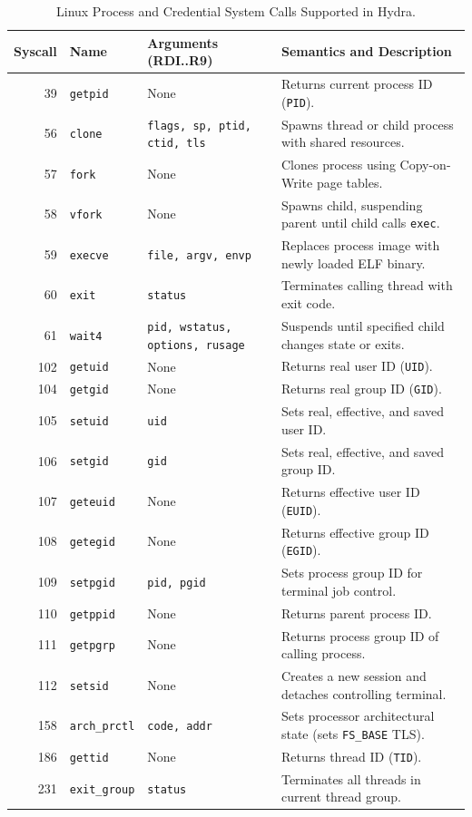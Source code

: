 \begin{table}[htbp]
\centering
\small
\begin{tabularx}{\textwidth}{rllX}
\toprule
\textbf{Syscall} & \textbf{Name} & \textbf{Arguments (RDI..R9)} & \textbf{Semantics and Description} \\
\midrule
39 & \texttt{getpid} & None & Returns current process ID (\texttt{PID}). \\
56 & \texttt{clone} & \texttt{flags, sp, ptid, ctid, tls} & Spawns thread or child process with shared resources. \\
57 & \texttt{fork} & None & Clones process using Copy-on-Write page tables. \\
58 & \texttt{vfork} & None & Spawns child, suspending parent until child calls \texttt{exec}. \\
59 & \texttt{execve} & \texttt{file, argv, envp} & Replaces process image with newly loaded ELF binary. \\
60 & \texttt{exit} & \texttt{status} & Terminates calling thread with exit code. \\
61 & \texttt{wait4} & \texttt{pid, wstatus, options, rusage} & Suspends until specified child changes state or exits. \\
102 & \texttt{getuid} & None & Returns real user ID (\texttt{UID}). \\
104 & \texttt{getgid} & None & Returns real group ID (\texttt{GID}). \\
105 & \texttt{setuid} & \texttt{uid} & Sets real, effective, and saved user ID. \\
106 & \texttt{setgid} & \texttt{gid} & Sets real, effective, and saved group ID. \\
107 & \texttt{geteuid} & None & Returns effective user ID (\texttt{EUID}). \\
108 & \texttt{getegid} & None & Returns effective group ID (\texttt{EGID}). \\
109 & \texttt{setpgid} & \texttt{pid, pgid} & Sets process group ID for terminal job control. \\
110 & \texttt{getppid} & None & Returns parent process ID. \\
111 & \texttt{getpgrp} & None & Returns process group ID of calling process. \\
112 & \texttt{setsid} & None & Creates a new session and detaches controlling terminal. \\
158 & \texttt{arch\_prctl} & \texttt{code, addr} & Sets processor architectural state (sets \texttt{FS\_BASE} TLS). \\
186 & \texttt{gettid} & None & Returns thread ID (\texttt{TID}). \\
231 & \texttt{exit\_group}& \texttt{status} & Terminates all threads in current thread group. \\
\bottomrule
\end{tabularx}
\caption{Linux Process and Credential System Calls Supported in Hydra.}
\label{tab:syscall_proc}
\end{table}

